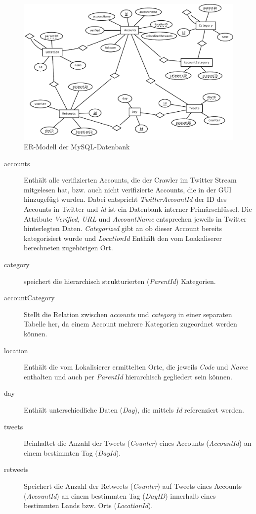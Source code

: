 \begin{figure}[h!]
	\centering
	\includegraphics[width=\textwidth,height=\textheight, keepaspectratio=true]{dia/er}
	\caption{ER-Modell der MySQL-Datenbank}
	\label{fig:mysql-er}
\end{figure}

\begin{description}
	\item[accounts] Enthält alle verifizierten Accounts, die der Crawler im Twitter Stream mitgelesen hat, bzw. auch nicht verifizierte Accounts, die in der GUI hinzugefügt wurden. Dabei entspricht \emph{TwitterAccountId} der ID des Accounts in Twitter und \emph{id} ist ein Datenbank interner Primärschlüssel. Die Attribute \emph{Verified}, \emph{URL} und \emph{AccountName} entsprechen jeweils in Twitter hinterlegten Daten. \emph{Categorized} gibt an ob dieser Account bereits kategorisiert wurde und \emph{LocationId} Enthält den vom Loakaliserer berechneten zugehörigen Ort.
	\item[category] speichert die hierarchisch strukturierten (\emph{ParentId}) Kategorien.
	\item[accountCategory] Stellt die Relation zwischen	\emph{accounts} und \emph{category} in einer separaten Tabelle her, da einem Account mehrere Kategorien zugeordnet werden können.
	\item[location] Enthält die vom Lokalisierer ermittelten Orte, die jeweils \emph{Code} und \emph{Name} enthalten und auch per \emph{ParentId} hierarchisch gegliedert sein können.	
	\item[day] Enthält unterschiedliche Daten (\emph{Day}), die mittels \emph{Id} referenziert werden.
	\item[tweets] Beinhaltet die Anzahl der Tweets (\emph{Counter}) eines Accounts (\emph{AccountId}) an einem bestimmten Tag (\emph{DayId}).
	\item[retweets] Speichert die Anzahl der Retweets (\emph{Counter}) auf Tweets eines Accounts (\emph{AccountId}) an einem bestimmten Tag (\emph{DayID}) innerhalb eines bestimmten Lands bzw. Orts (\emph{LocationId}).
\end{description}

